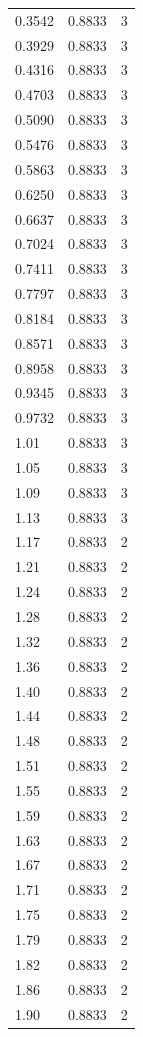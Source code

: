 \begin{longtable}{lrr}
  0.3542 & 0.8833 & 3 \\
  0.3929 & 0.8833 & 3 \\
  0.4316 & 0.8833 & 3 \\
  0.4703 & 0.8833 & 3 \\
  0.5090 & 0.8833 & 3 \\
  0.5476 & 0.8833 & 3 \\
  0.5863 & 0.8833 & 3 \\
  0.6250 & 0.8833 & 3 \\
  0.6637 & 0.8833 & 3 \\
  0.7024 & 0.8833 & 3 \\
  0.7411 & 0.8833 & 3 \\
  0.7797 & 0.8833 & 3 \\
  0.8184 & 0.8833 & 3 \\
  0.8571 & 0.8833 & 3 \\
  0.8958 & 0.8833 & 3 \\
  0.9345 & 0.8833 & 3 \\
  0.9732 & 0.8833 & 3 \\
  1.01 & 0.8833 & 3 \\
  1.05 & 0.8833 & 3 \\
  1.09 & 0.8833 & 3 \\
  1.13 & 0.8833 & 3 \\
  1.17 & 0.8833 & 2 \\
  1.21 & 0.8833 & 2 \\
  1.24 & 0.8833 & 2 \\
  1.28 & 0.8833 & 2 \\
  1.32 & 0.8833 & 2 \\
  1.36 & 0.8833 & 2 \\
  1.40 & 0.8833 & 2 \\
  1.44 & 0.8833 & 2 \\
  1.48 & 0.8833 & 2 \\
  1.51 & 0.8833 & 2 \\
  1.55 & 0.8833 & 2 \\
  1.59 & 0.8833 & 2 \\
  1.63 & 0.8833 & 2 \\
  1.67 & 0.8833 & 2 \\
  1.71 & 0.8833 & 2 \\
  1.75 & 0.8833 & 2 \\
  1.79 & 0.8833 & 2 \\
  1.82 & 0.8833 & 2 \\
  1.86 & 0.8833 & 2 \\
  1.90 & 0.8833 & 2 \\

\end{longtable}
